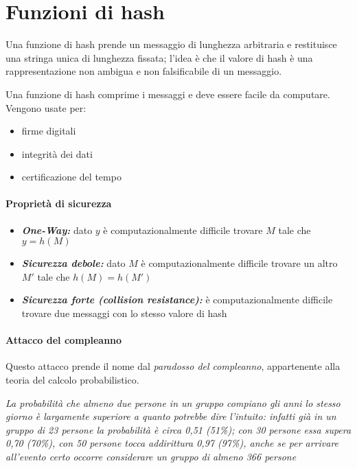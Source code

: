 \chapter{Funzioni di hash}

Una funzione di hash prende un messaggio di lunghezza arbitraria e restituisce 
una stringa unica di lunghezza fissata; l'idea è che il valore di hash è una rappresentazione 
non ambigua e non falsificabile di un messaggio.

\noindent Una funzione di hash comprime i messaggi e deve essere facile da computare. Vengono 
usate per:
\begin{itemize}
    \item firme digitali 
    \item integrità dei dati 
    \item certificazione del tempo
\end{itemize}

\subsubsection{Proprietà di sicurezza}

\begin{itemize}
    \item \textbf{\textit{One-Way:}} dato $y$ è computazionalmente difficile trovare $M$
    tale che $y=h(M)$
    \item \textbf{\textit{Sicurezza debole:}} dato $M$ è computazionalmente difficile trovare 
    un altro $M'$ tale che $h(M)=h(M')$
    \item \textbf{\textit{Sicurezza forte (collision resistance):}} è computazionalmente difficile trovare due 
    messaggi con lo stesso valore di hash
\end{itemize}

\subsubsection{Attacco del compleanno}

Questo attacco prende il nome dal \textit{paradosso del compleanno}, appartenente alla teoria del calcolo probabilistico.

\noindent \textit{La probabilità che almeno due persone in
un gruppo compiano gli anni lo stesso giorno è largamente superiore a quanto potrebbe dire l’intuito: infatti già in un
gruppo di 23 persone la probabilità è circa 0,51 (51\%); con 30 persone essa supera 0,70 (70\%), con 50 persone tocca
addirittura 0,97 (97\%), anche se per arrivare all’evento certo occorre considerare un gruppo di almeno 366 persone}

